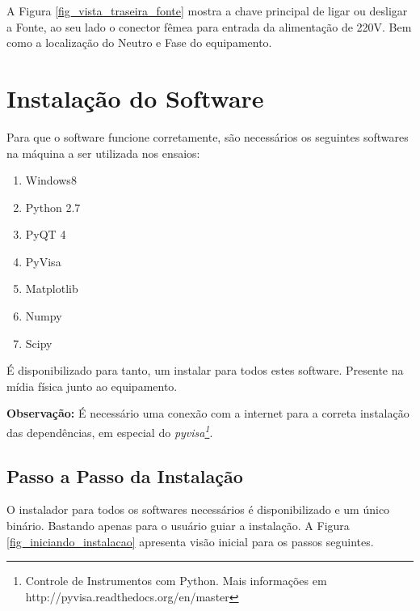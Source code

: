 \documentclass[a4paper, 10pt]{article}
\begin{document}
A Figura \ref{fig_vista_traseira_fonte} mostra a chave principal de ligar ou 
desligar a Fonte, ao seu lado o conector fêmea para entrada da alimentação de 220V.
Bem como a localização do Neutro e Fase do equipamento. 




\section{Instalação do Software}

Para que o software funcione corretamente, são necessários os seguintes softwares
na máquina a ser utilizada nos ensaios:

\begin{enumerate}
    \item Windows8
    \item Python 2.7
    \item PyQT 4
    \item PyVisa
    \item Matplotlib
    \item Numpy
    \item Scipy
\end{enumerate}

É disponibilizado para tanto, um instalar para todos estes software. Presente 
na mídia física junto ao equipamento. 

\textbf{Observação:} É necessário uma conexão com a internet para a correta 
instalação das dependências, em especial do  \textit{pyvisa\footnote{Controle de Instrumentos com Python. Mais informações em http://pyvisa.readthedocs.org/en/master}}.


\subsection{Passo a Passo da Instalação}

O instalador para todos os softwares necessários é disponibilizado e um único
binário. Bastando apenas para o usuário guiar a instalação. A Figura \ref{fig_iniciando_instalacao} apresenta visão inicial para os passos seguintes.
\end{document}
